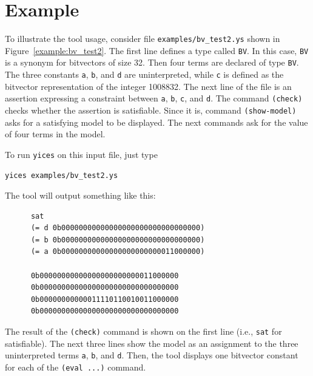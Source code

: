 \documentclass[11pt,twoside,fleqn,openright,titlepage]{cslreport}
\begin{document}
\section{Example}

To      illustrate     the      tool     usage,      consider     file
\texttt{examples/bv\_test2.ys} shown in Figure~\ref{example:bv_test2}.
The  first line  defines  a  type called  \texttt{BV}.  In this  case,
\texttt{BV} is  a synonym for bitvectors  of size 32. Then  four terms
are  declared of  type \texttt{BV}.   The three  constants \texttt{a},
\texttt{b},  and \texttt{d}  are  uninterpreted,  while \texttt{c}  is
defined as  the bitvector representation  of the integer  1008832. The
next line of the file is  an assertion expressing a constraint between
\texttt{a},  \texttt{b},  \texttt{c},   and  \texttt{d}.  The  command
\texttt{(check)} checks whether the assertion is satisfiable. Since it
is, command  \texttt{(show-model)} asks for  a satisfying model  to be
displayed. The  next commands ask for  the value of four  terms in the
model.


\medskip\noindent
To run \texttt{yices} on this input file, just type
\begin{small}
\begin{lstlisting}[language=sh]
   yices examples/bv_test2.ys
\end{lstlisting}
\end{small}
The tool will output something like this:
\begin{small}
\begin{verbatim}
      sat
      (= d 0b00000000000000000000000000000000)
      (= b 0b00000000000000000000000000000000)
      (= a 0b00000000000000000000000011000000)

      0b00000000000000000000000011000000
      0b00000000000000000000000000000000
      0b00000000000011110110010011000000
      0b00000000000000000000000000000000
\end{verbatim}
\end{small}
The result of the \texttt{(check)}  command is shown on the first line
(i.e., \texttt{sat}  for satisfiable). The  next three lines  show the
model as  an assignment to  the three uninterpreted  terms \texttt{a},
\texttt{b},  and \texttt{d}.  Then,  the tool  displays one  bitvector
constant for each of the \texttt{(eval ...)} command.
\end{document}
